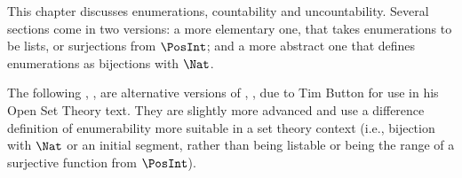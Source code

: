 \documentclass[../../../include/open-logic-chapter]{subfiles}
\begin{document}

\begin{editorial}
This chapter discusses enumerations, countability and uncountability.
Several sections come in two versions: a more elementary one, that
takes enumerations to be lists, or surjections from $\PosInt$; and a
more abstract one that defines enumerations as bijections with $\Nat$.
\end{editorial}











\begin{editorial}
The following ,
,  are
alternative versions of ,
,  due to Tim
Button for use in his Open Set Theory text. They are slightly more
advanced and use a difference definition of enumerability more
suitable in a set theory context (i.e., bijection with $\Nat$ or an
initial segment, rather than being listable or being the range of a
surjective function from $\PosInt$).
\end{editorial}




\OLEndChapterHook
\end{document}
